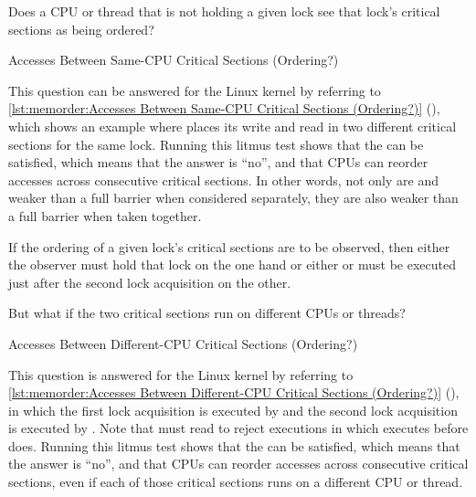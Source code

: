 Does a CPU or thread that is not holding a given lock see that lock's
critical sections as being ordered?

\begin{listing}

\caption{Accesses Between Same-CPU Critical Sections (Ordering?)}
\label{lst:memorder:Accesses Between Same-CPU Critical Sections (Ordering?)}
\end{listing}

This question can be answered for the Linux kernel by referring to
\cref{lst:memorder:Accesses Between Same-CPU Critical Sections (Ordering?)}
(), which
shows an example where  places its write and read in two
different critical sections for the same lock.
Running this litmus test shows that the  can be satisfied,
which means that the answer is ``no'', and that CPUs can reorder accesses
across consecutive critical sections.
In other words, not only are  and 
weaker than a full barrier when considered separately, they are also
weaker than a full barrier when taken together.

If the ordering of a given lock's critical sections are to be observed,
then either the observer must hold that lock on the one hand or either
 or 
must be executed just after the second lock acquisition on the other.

But what if the two critical sections run on different CPUs or threads?

\begin{listing}

\caption{Accesses Between Different-CPU Critical Sections (Ordering?)}
\label{lst:memorder:Accesses Between Different-CPU Critical Sections (Ordering?)}
\end{listing}

This question is answered for the Linux kernel by referring to
\cref{lst:memorder:Accesses Between Different-CPU Critical Sections (Ordering?)}
(),
in which the first lock acquisition is executed by  and the
second lock acquisition is executed by .
Note that  must read  to reject executions in which
 executes before  does.
Running this litmus test shows that the  can be satisfied,
which means that the answer is ``no'', and that CPUs can reorder accesses
across consecutive critical sections, even if each of those critical
sections runs on a different CPU or thread.

